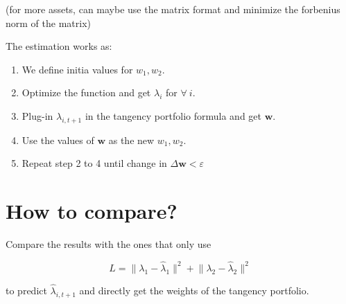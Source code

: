 \documentclass{article}
\begin{document}
(for more assets, can maybe use the matrix format and minimize the forbenius norm of the matrix)

The estimation works as:

\begin{enumerate}
    \item We define initia values for $w_1, w_2$.
    \item Optimize the function and get $\lambda_i$ for $\forall \ i$.
    \item Plug-in $\lambda_{i, t+1}$ in the tangency portfolio formula and get $\mathbf{w}$.
    \item Use the values of $\mathbf{w}$ as the new $w_1, w_2$.
    \item Repeat step 2 to 4 until change in $\Delta \mathbf{w} < \varepsilon$ 
\end{enumerate}

\section{How to compare?}

Compare the results with the ones that only use

$$
L = \lVert \lambda_1 - \hat{\lambda}_1 \rVert^2 + \lVert \lambda_2 - \hat{\lambda}_2 \rVert^2
$$

to predict $\hat{\lambda}_{i, t+1}$ and directly get the weights of the tangency portfolio.
\end{document}
